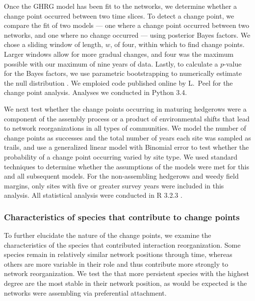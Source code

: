 \documentclass[12pt]{article}
\begin{document}
Once the GHRG model has been fit to the networks, we determine whether
a change point occurred between two time slices. To detect a change
point, we compare the fit of two models --- one where a change point
occurred between two networks, and one where no change occurred ---
using posterior Bayes factors. We chose a sliding window of length,
$w$, of four, within which to find change points. Larger windows allow
for more gradual changes, and four was the maximum possible with our
maximum of nine years of data. Lastly, to calculate a $p$-value for
the Bayes factors, we use parametric bootstrapping to numerically
estimate the null distribution \citep{peel2014detecting}. We emploied
code published online by L.~Peel for the change point
analysis. Analyses we conducted in Python 3.4.

We next test whether the change points occurring in maturing hedgerows
were a component of the assembly process or a product of environmental
shifts that lead to network reorganizations in all types of
communities. We model the number of change points as successes and the
total number of years each site was sampled as trails, and use a
generalized linear model with Binomial error to test whether the
probability of a change point occurring varied by site type. We used
standard techniques to determine whether the assumptions of the models
were met for this and all subsequent models. For the non-assembling
hedgerows and weedy field margins, only sites with five or greater
survey years were included in this analysis. All statistical analysis
were conducted in R 3.2.3 \citep{R}.

\subsubsection*{Characteristics of species that contribute to change
  points}

To further elucidate the nature of the change points, we examine the
characteristics of the species that contributed interaction
reorganization. Some species remain in relatively similar network
positions through time, whereas others are more variable in their role
and thus contribute more strongly to network reorganization. We test
the that more persistent species with the highest degree are the most
stable in their network position, as would be expected is the networks
were assembling via preferential attachment.
\end{document}
